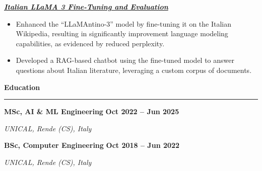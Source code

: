 \documentclass[9pt, a4paper]{article}
\newcommand{\cvsection}[1]{%
	\vspace{2pt}\par
	{\Large\bfseries\color{sectionblue}#1}\par
	\vspace{2pt}\hrule\vspace{6pt}
}
\newcommand{\cvsubsection}[3]{%
	\par {\large\bfseries #1} \hfill {\bfseries #2} \par {\textit{#3}} \vspace{4pt}
}
\newcommand{\cvproject}[1]{%
	\par {\large{\bfseries{\textit{#1}}}} \par \vspace{4pt}
}
\begin{document}
\begin{minipage}[t]{0.67\linewidth}
		\vspace{6pt}
		\cvproject{\href{https://github.com/bGuzzo/Italian-LLaMA-Project}{Italian LLaMA 3 Fine-Tuning and Evaluation}}
		\begin{itemize}[leftmargin=*, nosep]
			\item \footnotesize Enhanced the ``LLaMAntino-3'' model by fine-tuning it on the Italian Wikipedia, resulting in significantly improvement language modeling capabilities, as evidenced by reduced perplexity.
			
			\vspace{2pt}
			\item \footnotesize Developed a RAG-based chatbot using the fine-tuned model to answer questions about Italian literature, leveraging a custom corpus of documents.
		\end{itemize}
		
		\vspace{10pt}\par
		\cvsection{Education}
		
		\cvsubsection{MSc, AI \& ML Engineering}{Oct 2022 -- Jun 2025}{UNICAL, Rende (CS), Italy}
		\cvsubsection{BSc, Computer Engineering}{Oct 2018 -- Jun 2022}{UNICAL, Rende (CS), Italy}
		
	\end{minipage}%
	\hfill%
\end{document}
